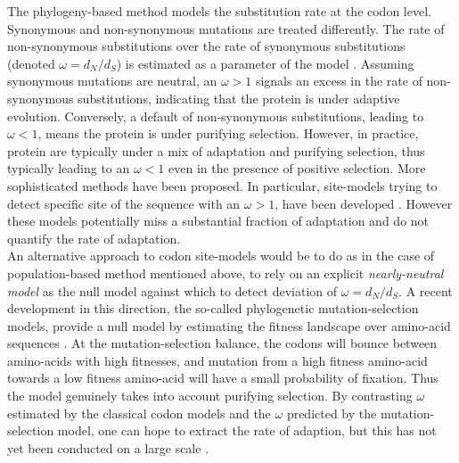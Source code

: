 \documentclass{article}
\begin{document}
	The phylogeny-based method models the substitution rate at the codon level. Synonymous and non-synonymous mutations are treated differently. The rate of non-synonymous substitutions over the rate of synonymous substitutions (denoted $\omega=d_N/d_S$) is estimated as a parameter of the model \cite{Muse1994,Goldman1994}. Assuming synonymous mutations are neutral, an $\omega>1$ signals an excess in the rate of non-synonymous substitutions, indicating that the protein is under adaptive evolution. Conversely, a default of non-synonymous substitutions, leading to $\omega<1$, means the protein is under purifying selection. However, in practice, protein are typically under a mix of adaptation and purifying selection, thus typically leading to an $\omega<1$ even in the presence of positive selection. More sophisticated methods have been proposed. In particular, site-models trying to detect specific site of the sequence with an $\omega>1$, have been developed \cite{Yang2001, kosiol_patterns_2008}.
	However these models potentially miss a substantial fraction of adaptation and do not quantify the rate of adaptation.  \\
	
	An alternative approach to codon site-models would be to do as in the case of population-based method mentioned above, to rely on an explicit \textit{nearly-neutral model} as the null model against which to detect deviation of $\omega=d_N/d_S$. A recent development in this direction, the so-called phylogenetic mutation-selection models, provide a null model by estimating the fitness landscape over amino-acid sequences \cite{Yang2008, Halpern1998, Rodrigue2010}. At the mutation-selection balance, the codons will bounce between amino-acids with high fitnesses, and mutation from a high fitness amino-acid towards a low fitness amino-acid will have a small probability of fixation. Thus the model genuinely takes into account purifying selection. By contrasting $\omega$ estimated by the classical codon models and the $\omega$ predicted by the mutation-selection model, one can hope to extract the rate of adaption, but this has not yet been conducted on a large scale \cite{Rodrigue2016}. \\
	
\end{document}
